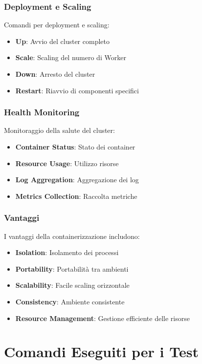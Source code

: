 \documentclass[12pt,a4paper]{article}
\begin{document}
\subsubsection{Deployment e Scaling}

Comandi per deployment e scaling:

\begin{itemize}
\item \textbf{Up}: Avvio del cluster completo
\item \textbf{Scale}: Scaling del numero di Worker
\item \textbf{Down}: Arresto del cluster
\item \textbf{Restart}: Riavvio di componenti specifici
\end{itemize}

\subsubsection{Health Monitoring}

Monitoraggio della salute del cluster:

\begin{itemize}
\item \textbf{Container Status}: Stato dei container
\item \textbf{Resource Usage}: Utilizzo risorse
\item \textbf{Log Aggregation}: Aggregazione dei log
\item \textbf{Metrics Collection}: Raccolta metriche
\end{itemize}

\subsubsection{Vantaggi}

I vantaggi della containerizzazione includono:

\begin{itemize}
\item \textbf{Isolation}: Isolamento dei processi
\item \textbf{Portability}: Portabilità tra ambienti
\item \textbf{Scalability}: Facile scaling orizzontale
\item \textbf{Consistency}: Ambiente consistente
\item \textbf{Resource Management}: Gestione efficiente delle risorse
\end{itemize}

\section{Comandi Eseguiti per i Test}
\end{document}
